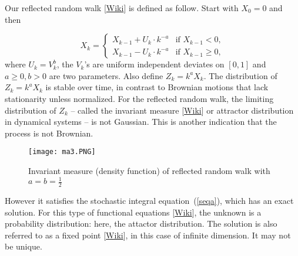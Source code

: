 \documentclass[oneside,10pt]{book}
\begin{document}
Our \textcolor{index}{reflected random walk} [\href{https://en.wikipedia.org/wiki/Reflected_Brownian_motion}{Wiki}] is defined as follow. Start with $X_0=0$ and then

\begin{equation}
X_k = \begin{cases}X_{k-1} + U_k\cdot k^{-a} & \text{if } X_{k-1} < 0, \\
                      X_{k-1} - U_k\cdot k^{-a}                                   & \text{if }   X_{k-1} \geq 0,%
        \end{cases}\label{poputres}
\end{equation}
where $U_k = V^b_k$, the $V_k$'s are uniform independent deviates on $[0, 1]$ and $a\geq 0, b>0$ are two parameters.
Also define $Z_k=k^a X_k$.
The distribution of $Z_k = k^a X_k$ is stable over time, in contrast to Brownian motions that lack stationarity unless normalized. For the reflected random walk, the limiting distribution of $Z_k$ -- called the \textcolor{index}{invariant measure} [\href{https://en.wikipedia.org/wiki/Invariant_measure}{Wiki}]
 or \textcolor{index}{attractor distribution} in dynamical systems -- is not Gaussian. This is another indication that the process is not Brownian.

\begin{figure}[H]
\centering
\texttt{[image: ma3.PNG]} %
\caption{Invariant measure (density function) of reflected random walk with $a=b=\frac{1}{2}$}
\label{fig:iv}
\end{figure}

However it satisfies
 the \textcolor{index}{stochastic integral equation}~(\ref{seqa}), which has an exact solution. For this type of
 \textcolor{index}{functional equations} [\href{https://en.wikipedia.org/wiki/Functional_equation}{Wiki}], the unknown is a probability distribution: here, the attactor distribution. The solution is also referred to as a
\textcolor{index}{fixed point} [\href{https://en.wikipedia.org/wiki/Fixed_point_(mathematics)}{Wiki}], in this case of infinite dimension. It may not be unique.
\end{document}
